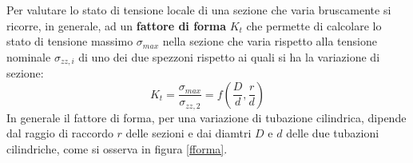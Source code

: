 		
		\begin{concetto}
			Per valutare lo stato di tensione locale di una sezione che varia bruscamente si ricorre, in generale, ad un \textbf{fattore di forma} $K_t$ che permette di calcolare lo stato di tensione massimo $\sigma_{max}$ nella sezione che varia rispetto alla tensione nominale $\sigma_{zz,i}$ di uno dei due spezzoni rispetto ai quali si ha la variazione di sezione:
			\begin{equation}
				K_t = \frac{\sigma_{max}}{\sigma_{zz,2}} = f\left(\frac D d, \frac r d\right)
			\end{equation}
			In generale il fattore di forma, per una variazione di tubazione cilindrica, dipende dal raggio di raccordo $r$ delle sezioni e dai diamtri $D$ e $d$ delle due tubazioni cilindriche, come si osserva in figura \ref{fforma}.
		\end{concetto}
	
		
		
		
		
		
		
		
		
		
		
		
		
		
		
		
	